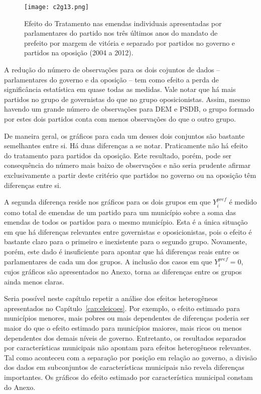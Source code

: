 \begin{figure}[htp]
	\centering
	\texttt{[image: c2g13.png]}
	\caption{Efeito do Tratamento nas emendas individuais apresentadas por parlamentares do partido nos três últimos anos do mandato de prefeito por margem de vitória e separado por partidos no governo e partidos na oposição (2004 a 2012).}
	\label{fig:c2g13}
\end{figure}

A redução do número de observações para os dois cojuntos de dados -- parlamentares do governo e da oposição -- tem como efeito a perda de significância estatística em quase todas as medidas. Vale notar que há mais partidos no grupo de governistas do que no grupo oposicionistas. Assim, mesmo havendo um grande número de observações para DEM e PSDB, o grupo formado por estes dois partidos conta com menos observações do que o outro grupo.

De maneira geral, os gráficos para cada um desses dois conjuntos são bastante semelhantes entre si. Há duas diferenças a se notar. Praticamente não há efeito do tratamento para partidos da oposição. Este resultado, porém, pode ser consequência do número mais baixo de observações e não seria prudente afirmar exclusivamente a partir deste critério que partidos no governo ou na oposição têm diferenças entre si.

A segunda diferença reside nos gráficos para os dois grupos em que $Y_{i}^{pref}$ é medido como total de emendas de um partido para um município sobre a soma das emendas de todos os partidos para o mesmo município. Esta é a única situação em que há diferenças relevantes entre governistas e oposicionistas, pois o efeito é bastante claro para o primeiro e inexistente para o segundo grupo. Novamente, porém, este dado é insuficiente para apontar que há diferenças reais entre os parlamentares de cada um dos grupos. A inclusão dos casos em que $Y_{i}^{pref}=0$, cujos gráficos são apresentados no Anexo, torna as diferenças entre os grupos ainda menos claras.

Seria possível neste capítulo repetir a análise dos efeitos heterogêneos apresentados no Capítulo~\ref{cap:eleicoes}. Por exemplo, o efeito estimado para municípios menores, mais pobres ou mais dependentes de diferenças poderia ser maior do que o efeito estimado para municípios maiores, mais ricos ou menos dependentes dos demais níveis de governo. Entretanto, os resultados separados por características municipais não apontam para efeitos heterogêneos relevantes. Tal como aconteceu com a separação por posição em relação ao governo, a divisão dos dados em subconjuntos de características municipais não revela diferenças importantes. Os gráficos do efeito estimado por característica municipal constam do Anexo.

